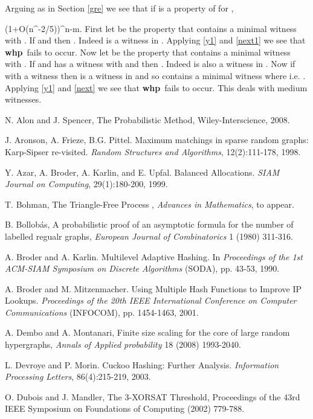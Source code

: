 \documentclass[11pt]{article}
\def\cP{{\cal P}}
\def\whp{{\bf whp}}
\def\cG{{\cal G}}
\def\cQ{{\cal Q}}
\newcommand{\beq}[1]{}
\begin{document}
Arguing as in Section \ref{gre} we see that if
 is a property of  for , 
\beq{y1}
\frac{|\cP_m|}{\cG(n,m)}\leq (1+O(n^{-2/5}))^{n-m}\frac{|\cQ|}{\cG(m+n^{4/5},m)}.
\eeq
First let  be 
the property that  contains a minimal witness  with .
If  and  then . 
Indeed  is a witness in .
Applying \eqref{y1} and \eqref{next1} we see that 
\whp\  fails to occur. 
Now let  be the property that  contains a minimal
witness  with .
If  and  has a 
witness  with  and  
then . Indeed  is 
also a witness in . Now if  with a witness
 then  is a witness in  and so contains 
a minimal witness  where 
 i.e. .
Applying \eqref{y1} and \eqref{next} we see that 
\whp\  fails to occur. 
This deals with medium witnesses.
\begin{thebibliography}{100}

 N. Alon and J. Spencer, The Probabilistic Method, Wiley-Interscience, 2008.

 J. Aronson, A. Frieze, B.G. Pittel. Maximum matchings in
  sparse random graphs: Karp-Sipser re-visited. \emph{Random
    Structures and Algorithms}, 12(2):111-178, 1998.

 Y. Azar, A. Broder, A. Karlin, and E. Upfal. Balanced
    Allocations. \emph{SIAM Journal on Computing}, 29(1):180-200,
    1999.

 T. Bohman, The Triangle-Free Process , {\em Advances in Mathematics}, to appear.

 B. Bollob\'as, A probabilistic proof of an asymptotic formula for the number of labelled regualr graphs,
{\em European Journal of Combinatorics} 1 (1980) 311-316.

 A. Broder and A. Karlin. Multilevel Adaptive Hashing. In
    \emph{Proceedings of the 1st ACM-SIAM Symposium on Discrete
    Algorithms} (SODA), pp. 43-53, 1990.

 A. Broder and M. Mitzenmacher. Using Multiple Hash
    Functions to Improve IP Lookups. \emph{Proceedings of the 20th
    IEEE International Conference on Computer Communications}
    (INFOCOM), pp. 1454-1463, 2001.

 A. Dembo and A. Montanari, Finite size scaling for the core of large random hypergraphs,
{\em Annals of Applied probability} 18 (2008) 1993-2040.

 L. Devroye and P. Morin.  Cuckoo Hashing: Further
    Analysis. \emph{Information Processing Letters}, 86(4):215-219,
    2003.

 O. Dubois and J. Mandler, The 3-XORSAT Threshold, Proceedings of the 43rd IEEE Symposium
on Foundations of Computing (2002) 779-788.


\end{thebibliography}
\end{document}
